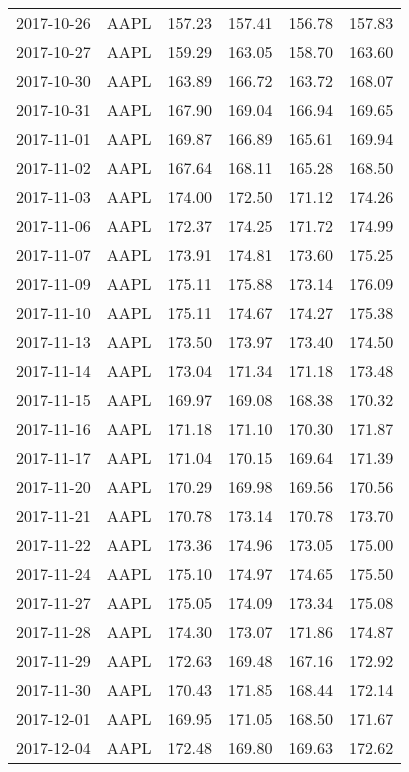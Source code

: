 \documentclass[a4paper, 12pt]{report}
\begin{document}
\begin{appendices}
\begin{longtable}{llllll}
  2017-10-26 & AAPL & 157.23 & 157.41 & 156.78 & 157.83 \\ 
  2017-10-27 & AAPL & 159.29 & 163.05 & 158.70 & 163.60 \\ 
  2017-10-30 & AAPL & 163.89 & 166.72 & 163.72 & 168.07 \\ 
  2017-10-31 & AAPL & 167.90 & 169.04 & 166.94 & 169.65 \\ 
  2017-11-01 & AAPL & 169.87 & 166.89 & 165.61 & 169.94 \\ 
  2017-11-02 & AAPL & 167.64 & 168.11 & 165.28 & 168.50 \\ 
  2017-11-03 & AAPL & 174.00 & 172.50 & 171.12 & 174.26 \\ 
  2017-11-06 & AAPL & 172.37 & 174.25 & 171.72 & 174.99 \\ 
  2017-11-07 & AAPL & 173.91 & 174.81 & 173.60 & 175.25 \\ 
  2017-11-09 & AAPL & 175.11 & 175.88 & 173.14 & 176.09 \\ 
  2017-11-10 & AAPL & 175.11 & 174.67 & 174.27 & 175.38 \\ 
  2017-11-13 & AAPL & 173.50 & 173.97 & 173.40 & 174.50 \\ 
  2017-11-14 & AAPL & 173.04 & 171.34 & 171.18 & 173.48 \\ 
  2017-11-15 & AAPL & 169.97 & 169.08 & 168.38 & 170.32 \\ 
  2017-11-16 & AAPL & 171.18 & 171.10 & 170.30 & 171.87 \\ 
  2017-11-17 & AAPL & 171.04 & 170.15 & 169.64 & 171.39 \\ 
  2017-11-20 & AAPL & 170.29 & 169.98 & 169.56 & 170.56 \\ 
  2017-11-21 & AAPL & 170.78 & 173.14 & 170.78 & 173.70 \\ 
  2017-11-22 & AAPL & 173.36 & 174.96 & 173.05 & 175.00 \\ 
  2017-11-24 & AAPL & 175.10 & 174.97 & 174.65 & 175.50 \\ 
  2017-11-27 & AAPL & 175.05 & 174.09 & 173.34 & 175.08 \\ 
  2017-11-28 & AAPL & 174.30 & 173.07 & 171.86 & 174.87 \\ 
  2017-11-29 & AAPL & 172.63 & 169.48 & 167.16 & 172.92 \\ 
  2017-11-30 & AAPL & 170.43 & 171.85 & 168.44 & 172.14 \\ 
  2017-12-01 & AAPL & 169.95 & 171.05 & 168.50 & 171.67 \\ 
  2017-12-04 & AAPL & 172.48 & 169.80 & 169.63 & 172.62 \\ 

\end{longtable}
\end{appendices}
\end{document}
